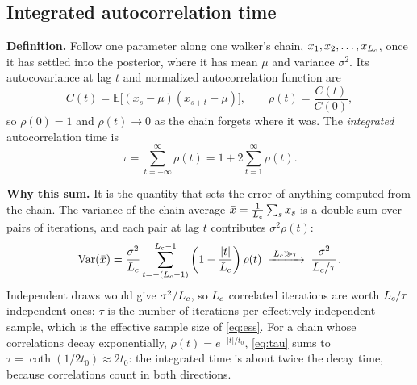 \subsection{Integrated autocorrelation time}

\textbf{Definition.} Follow one parameter along one walker's chain, $x_1, x_2, \dots, x_{L_c}$, once
it has settled into the posterior, where it has mean $\mu$ and variance $\sigma^2$. Its
autocovariance at lag $t$ and normalized autocorrelation function are
\begin{equation}
  C(t) = \mathbb{E}\big[(x_s - \mu)(x_{s+t} - \mu)\big],
  \qquad
  \rho(t) = \frac{C(t)}{C(0)} ,
\end{equation}
so $\rho(0) = 1$ and $\rho(t) \to 0$ as the chain forgets where it was. The \emph{integrated}
autocorrelation time is
\begin{equation}
  \tau = \sum_{t=-\infty}^{\infty} \rho(t) = 1 + 2 \sum_{t=1}^{\infty} \rho(t) .
  \label{eq:tau}
\end{equation}

\textbf{Why this sum.} It is the quantity that sets the error of anything computed from the chain.
The variance of the chain average $\bar x = \frac{1}{L_c}\sum_s x_s$ is a double sum over pairs of
iterations, and each pair at lag $t$ contributes $\sigma^2\rho(t)$:
\begin{equation}
  \mathrm{Var}(\bar x)
  = \frac{\sigma^2}{L_c} \sum_{t=-(L_c-1)}^{L_c-1} \left(1 - \frac{|t|}{L_c}\right) \rho(t)
  \;\xrightarrow{\;L_c \gg \tau\;}\; \frac{\sigma^2}{L_c/\tau} .
  \label{eq:var-mean}
\end{equation}
Independent draws would give $\sigma^2/L_c$, so $L_c$ correlated iterations are worth $L_c/\tau$
independent ones: $\tau$ is the number of iterations per effectively independent sample, which is
the effective sample size of \cref{eq:ess}. For a chain whose correlations decay exponentially,
$\rho(t) = e^{-|t|/t_0}$, \cref{eq:tau} sums to $\tau = \coth(1/2t_0) \approx 2t_0$: the
integrated time is about twice the decay time, because correlations count in both directions.

